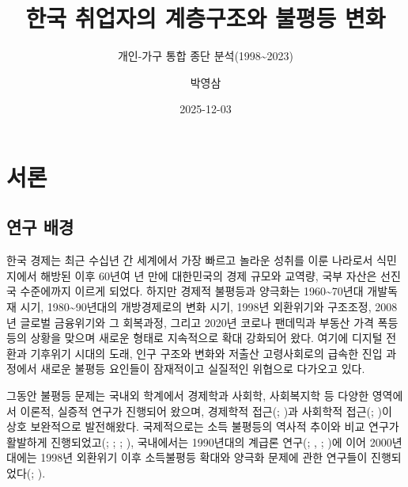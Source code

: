 \documentclass[
  letterpaper,
  DIV=11,
  numbers=noendperiod]{scrartcl}
\title{한국 취업자의 계층구조와 불평등 변화}
\subtitle{개인-가구 통합 종단 분석(1998\textasciitilde2023)}
\author{박영삼}
\date{2025-12-03}
\begin{document}
\maketitle


\section{서론}\label{uxc11cuxb860}

\subsection{연구 배경}\label{uxc5f0uxad6c-uxbc30uxacbd}

한국 경제는 최근 수십년 간 세계에서 가장 빠르고 놀라운 성취를 이룬
나라로서 식민지에서 해방된 이후 60년여 년 만에 대한민국의 경제 규모와
교역량, 국부 자산은 선진국 수준에까지 이르게 되었다. 하지만 경제적
불평등과 양극화는 1960\textasciitilde70년대 개발독재 시기,
1980\textasciitilde90년대의 개방경제로의 변화 시기, 1998년 외환위기와
구조조정, 2008년 글로벌 금융위기와 그 회복과정, 그리고 2020년 코로나
팬데믹과 부동산 가격 폭등 등의 상황을 맞으며 새로운 형태로 지속적으로
확대 강화되어 왔다. 여기에 디지털 전환과 기후위기 시대의 도래, 인구
구조와 변화와 저출산 고령사회로의 급속한 진입 과정에서 새로운 불평등
요인들이 잠재적이고 실질적인 위협으로 다가오고 있다.

그동안 불평등 문제는 국내외 학계에서 경제학과 사회학, 사회복지학 등
다양한 영역에서 이론적, 실증적 연구가 진행되어 왔으며, 경제학적
접근(;
)과 사회학적
접근(;
)이 상호 보완적으로 발전해왔다.
국제적으로는 소득 불평등의 역사적 추이와 비교 연구가 활발하게
진행되었고(;
;
;
),
국내에서는 1990년대의 계급론 연구(; ,
;
)에 이어 2000년대에는 1998년
외환위기 이후 소득불평등 확대와 양극화 문제에 관한 연구들이
진행되었다(;
).
\end{document}
